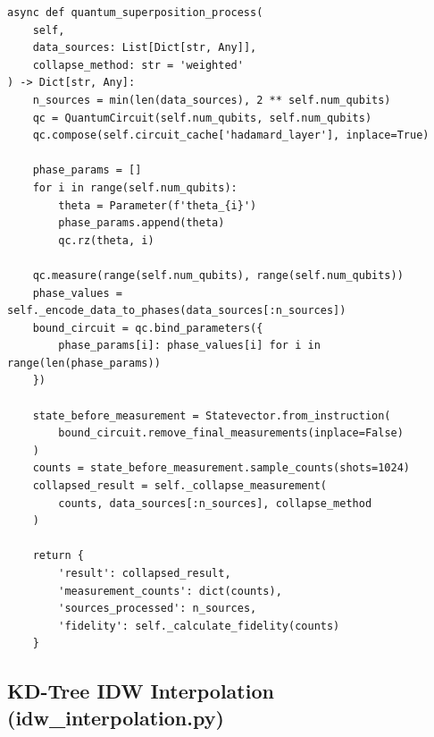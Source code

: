 \documentclass[12pt,a4paper]{article}
\begin{document}
\begin{lstlisting}[caption={Quantum superposition-based multi-source fusion
                            (backend/quantum/processor.py)},
                   label=lst:qfusion]
async def quantum_superposition_process(
    self,
    data_sources: List[Dict[str, Any]],
    collapse_method: str = 'weighted'
) -> Dict[str, Any]:
    n_sources = min(len(data_sources), 2 ** self.num_qubits)
    qc = QuantumCircuit(self.num_qubits, self.num_qubits)
    qc.compose(self.circuit_cache['hadamard_layer'], inplace=True)

    phase_params = []
    for i in range(self.num_qubits):
        theta = Parameter(f'theta_{i}')
        phase_params.append(theta)
        qc.rz(theta, i)

    qc.measure(range(self.num_qubits), range(self.num_qubits))
    phase_values = self._encode_data_to_phases(data_sources[:n_sources])
    bound_circuit = qc.bind_parameters({
        phase_params[i]: phase_values[i] for i in range(len(phase_params))
    })

    state_before_measurement = Statevector.from_instruction(
        bound_circuit.remove_final_measurements(inplace=False)
    )
    counts = state_before_measurement.sample_counts(shots=1024)
    collapsed_result = self._collapse_measurement(
        counts, data_sources[:n_sources], collapse_method
    )

    return {
        'result': collapsed_result,
        'measurement_counts': dict(counts),
        'sources_processed': n_sources,
        'fidelity': self._calculate_fidelity(counts)
    }
\end{lstlisting}

\subsection{KD-Tree IDW Interpolation (idw\_interpolation.py)}
\label{app:code:idw}
\end{document}
